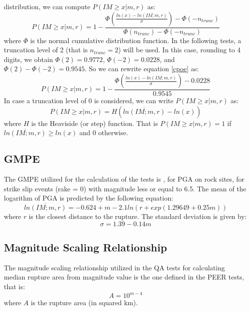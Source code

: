 distribution, we can compute $P(IM\geq x | m,r)$ as:
\begin{equation}
\label{cpoe}
P(IM\geq x | m,r) = 1 - \frac{\Phi(\frac{ln(x) - \overline{ln(IM;m,r)}} {\sigma}) - \Phi(-n_{trunc})}
					{\Phi(n_{trunc}) - \Phi(-n_{trunc})}
\end{equation}
where $\Phi$ is the normal cumulative distribution function. In the following
tests, a truncation level of 2 (that is $n_{trunc}=2$) will be used. In this
case, rounding to 4 digits, we obtain
$\Phi(2)=0.9772$, $\Phi(-2)=0.0228$, and $\Phi(2) - \Phi(-2)=0.9545$.
So we can rewrite equation \ref{cpoe} as: 
\label{cpoe2}
\begin{equation}
P(IM\geq x | m,r) = 1 - \frac{\Phi(\frac{ln(x) - \overline{ln(IM;m,r)}} {\sigma}) -0.0228}
					{0.9545}
\end{equation}
In case a truncation level of 0 is considered, we can write $P(IM\geq x | m,r)$ as:
\begin{equation}
\label{cpoe_0_trunc}
P(IM\geq x | m,r) = H(\overline{ln(IM;m,r)} - ln(x))
\end{equation}
where $H$ is the Heaviside (or step) function. That is $P(IM\geq x | m,r)=1$ if $\overline{ln(IM;m,r)} \geq ln(x)$ and $0$
otherwise.
\subsection{GMPE}
The GMPE utilized for the calculation of the tests is \textcite{sadigh1997}, 
for PGA on rock sites, for strike slip events (rake = 0) with magnitude less or
equal to 6.5. The mean of the logarithm of PGA is predicted by the following
equation:
\begin{equation}
\label{meanPGA}
\overline{ln(IM;m,r)} = -0.624 + m - 2.1 ln(r + exp(1.29649 + 0.25 m))
\end{equation}
where $r$ is the closest distance to the rupture. The standard deviation is given by:
\begin{equation}
\label{sigmaPGA}
\sigma = 1.39 - 0.14 m
\end{equation}
\subsection{Magnitude Scaling Relationship}
The magnitude scaling relationship utilized in the QA tests for calculating median rupture area from magnitude value is the
one defined in the PEER tests, that is:
\begin{equation}
\label{msr}
A = 10^{m - 4}
\end{equation}
where $A$ is the rupture area (in squared km).
%
